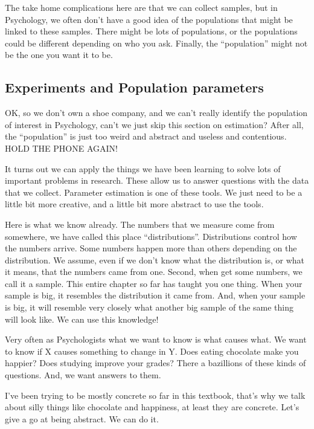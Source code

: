 \documentclass[
]{book}
\begin{document}
The take home complications here are that we can collect samples, but in Psychology, we often don't have a good idea of the populations that might be linked to these samples. There might be lots of populations, or the populations could be different depending on who you ask. Finally, the ``population'' might not be the one you want it to be.

\subsection{Experiments and Population parameters}\label{experiments-and-population-parameters}

OK, so we don't own a shoe company, and we can't really identify the population of interest in Psychology, can't we just skip this section on estimation? After all, the ``population'' is just too weird and abstract and useless and contentious. HOLD THE PHONE AGAIN!

It turns out we can apply the things we have been learning to solve lots of important problems in research. These allow us to answer questions with the data that we collect. Parameter estimation is one of these tools. We just need to be a little bit more creative, and a little bit more abstract to use the tools.

Here is what we know already. The numbers that we measure come from somewhere, we have called this place ``distributions''. Distributions control how the numbers arrive. Some numbers happen more than others depending on the distribution. We assume, even if we don't know what the distribution is, or what it means, that the numbers came from one. Second, when get some numbers, we call it a sample. This entire chapter so far has taught you one thing. When your sample is big, it resembles the distribution it came from. And, when your sample is big, it will resemble very closely what another big sample of the same thing will look like. We can use this knowledge!

Very often as Psychologists what we want to know is what causes what. We want to know if X causes something to change in Y. Does eating chocolate make you happier? Does studying improve your grades? There a bazillions of these kinds of questions. And, we want answers to them.

I've been trying to be mostly concrete so far in this textbook, that's why we talk about silly things like chocolate and happiness, at least they are concrete. Let's give a go at being abstract. We can do it.
\end{document}
